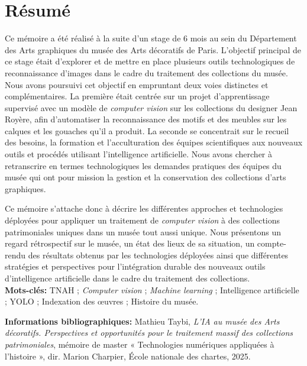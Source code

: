 \documentclass[12pt,twoside]{book}
\begin{document}
	\chapter{Résumé}
\medskip
	Ce mémoire a été réalisé à la suite d'un stage de 6 mois au sein du Département des Arts graphiques du musée des Arts décoratifs de Paris. L'objectif principal de ce stage était d'explorer et de mettre en place plusieurs outils technologiques de reconnaissance d'images dans le cadre du traitement des collections du musée. Nous avons poursuivi cet objectif en empruntant deux voies distinctes et complémentaires. La première était centrée sur un projet d'apprentissage supervisé avec un modèle de \textit{computer vision} sur les collections du designer Jean Royère, afin d'automatiser la reconnaissance des motifs et des meubles sur les calques et les gouaches qu'il a produit. La seconde se concentrait sur le recueil des besoins, la formation et l'acculturation des équipes scientifiques aux nouveaux outils et procédés utilisant l'intelligence artificielle. Nous avons chercher à retranscrire en termes technologiques les demandes pratiques des équipes du musée qui ont pour mission la gestion et la conservation des collections d'arts graphiques. 
    
    Ce mémoire s'attache donc à décrire les différentes approches et technologies déployées pour appliquer un traitement de \textit{computer vision} à des collections patrimoniales uniques dans un musée tout aussi unique. Nous présentons un regard rétrospectif sur le musée, un état des lieux de sa situation, un compte-rendu des résultats obtenus par les technologies déployées ainsi que différentes stratégies et perspectives pour l'intégration durable des nouveaux outils d'intelligence artificielle dans le cadre du traitement des collections. \\
	
	\textbf{Mots-clés:} TNAH ; \textit{Computer vision} ; \textit{Machine learning} ; Intelligence artificielle ; YOLO ; Indexation des œuvres ; Histoire du musée.
    

	\textbf{Informations bibliographiques:} Mathieu Taybi, \textit{L'IA au musée des Arts décoratifs. Perspectives et opportunités pour le traitement massif des collections patrimoniales}, mémoire de master « Technologies numériques appliquées à l'histoire », dir. Marion Charpier, École nationale des chartes, 2025.

\end{document}
